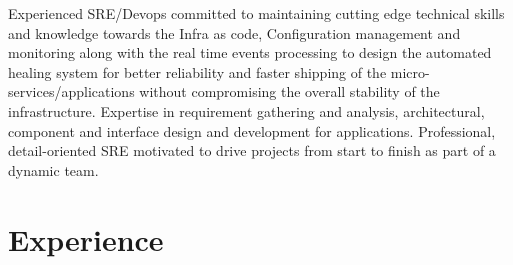 \documentclass[]{friggeri-cv} %
\begin{document}
{Experienced SRE/Devops committed to maintaining cutting edge technical skills and knowledge towards the Infra as code, Configuration management and monitoring along with the real time events processing to design the automated healing system for better reliability and faster shipping of the micro-services/applications without compromising the overall stability of the infrastructure. Expertise in requirement gathering and analysis, architectural, component and interface design and development for applications. Professional, detail-oriented SRE motivated to drive projects from start to finish as part of a dynamic team.}


\section{Experience}
\end{document}
